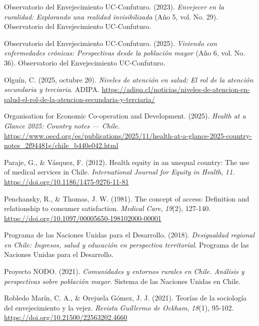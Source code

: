 \documentclass[
  spanish,
  a4paper,
  oneside]{scrbook}
\newlength{\cslhangindent}
\newenvironment{CSLReferences}[2] %
 {\begin{list}{}{%
  \setlength{\itemindent}{0pt}
  \setlength{\leftmargin}{0pt}
  \setlength{\parsep}{0pt}
  \ifodd #1
   \setlength{\leftmargin}{\cslhangindent}
   \setlength{\itemindent}{-1\cslhangindent}
  \fi
  \setlength{\itemsep}{#2\baselineskip}}}
 {\end{list}}
\begin{document}
\begin{CSLReferences}{1}{0}
Observatorio del Envejecimiento UC-Confuturo. (2023). \emph{Envejecer en
la ruralidad: Explorando una realidad invisibilizada} (Año 5, vol. No.
29). Observatorio del Envejecimiento UC-Confuturo.

Observatorio del Envejecimiento UC-Confuturo. (2025). \emph{Viviendo con
enfermedades crónicas: Perspectivas desde la población mayor} (Año 6,
vol. No. 36). Observatorio del Envejecimiento UC-Confuturo.

Olguín, C. (2025, octubre 20). \emph{Niveles de atención en salud: El
rol de la atención secundaria y terciaria}. ADIPA.
\url{https://adipa.cl/noticias/niveles-de-atencion-en-salud-el-rol-de-la-atencion-secundaria-y-terciaria/}

Organisation for Economic Co-operation and Development. (2025).
\emph{Health at a Glance 2025: {Country} notes --- {Chile}}.
\url{https://www.oecd.org/es/publications/2025/11/health-at-a-glance-2025-country-notes_2f94481e/chile_b440e042.html}

Paraje, G., \& Vásquez, F. (2012). Health equity in an unequal country:
{The} use of medical services in {Chile}. \emph{International Journal
for Equity in Health}, \emph{11}.
\url{https://doi.org/10.1186/1475-9276-11-81}

Penchansky, R., \& Thomas, J. W. (1981). The concept of access:
{Definition} and relationship to consumer satisfaction. \emph{Medical
Care}, \emph{19}(2), 127-140.
\url{https://doi.org/10.1097/00005650-198102000-00001}

Programa de las Naciones Unidas para el Desarrollo. (2018).
\emph{Desigualdad regional en Chile: Ingresos, salud y educación en
perspectiva territorial}. Programa de las Naciones Unidas para el
Desarrollo.

Proyecto NODO. (2021). \emph{Comunidades y entornos rurales en Chile.
Análisis y perspectivas sobre población mayor}. Sistema de las Naciones
Unidas en Chile.

Robledo Marín, C. A., \& Orejuela Gómez, J. J. (2021). Teorías de la
sociología del envejecimiento y la vejez. \emph{Revista Guillermo de
Ockham}, \emph{18}(1), 95-102.
\url{https://doi.org/10.21500/22563202.4660}


\end{CSLReferences}
\end{document}
